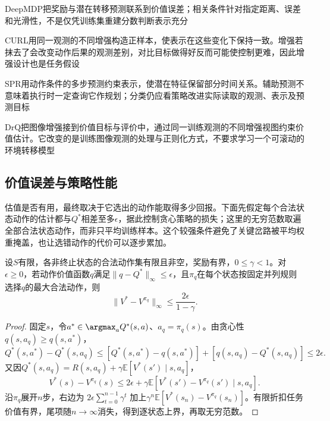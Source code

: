 DeepMDP把奖励与潜在转移预测联系到价值误差；相关条件针对指定距离、误差和光滑性，不是仅凭训练集重建分数判断表示充分

CURL用同一观测的不同增强构造正样本，使表示在这些变化下保持一致。增强若抹去了会改变动作后果的观测差别，对比目标做得好反而可能使控制更难，因此增强设计也是任务假设

SPR用动作条件的多步预测约束表示，使潜在特征保留部分时间关系。辅助预测不意味着执行时一定查询它作规划；分类仍应看策略改进实际读取的观测、表示及预测目标

DrQ把图像增强接到价值目标与评价中，通过同一训练观测的不同增强视图约束价值估计。它改变的是训练图像观测的处理与正则化方式，不要求学习一个可滚动的环境转移模型

\subsection{价值误差与策略性能}
\label{sec:rl-learning-value-performance}

估值是否有用，最终取决于它选出的动作能取得多少回报。下面先假定每个合法状态动作的估计都与$Q^*$相差至多$\epsilon$，据此控制贪心策略的损失；这里的无穷范数取遍全部合法状态动作，而非只平均训练样本。这个较强条件避免了关键岔路被平均权重掩盖，也让选错动作的代价可以逐步累加。

\begin{theorem}[动作价值误差到贪心策略损失]
  \label{thm:rl-learning-q-performance}
  设$S$有限，各非终止状态的合法动作集有限且非空，奖励有界，$0\leq\gamma<1$。对$\epsilon\geq0$，若动作价值函数$q$满足$\lVert q-Q^*\rVert_\infty\leq\epsilon$，且$\pi_q$在每个状态按固定并列规则选择$q$的最大合法动作，则
  \begin{equation}
    \lVert V^*-V^{\pi_q}\rVert_\infty
       \leq\frac{2\epsilon}{1-\gamma}.
    \label{eq:rl-learning-q-performance}
  \end{equation}
\end{theorem}
\begin{proof}
  固定$s$，令$a^*\in\argmax_aQ^*(s,a)$、$a_q=\pi_q(s)$。由贪心性$q(s,a_q)\geq q(s,a^*)$，
  \[
    Q^*(s,a^*)-Q^*(s,a_q)
      \leq[Q^*(s,a^*)-q(s,a^*)]
            +[q(s,a_q)-Q^*(s,a_q)]\leq2\epsilon.
  \]
  又因$Q^*(s,a_q)=R(s,a_q)+\gamma\mathbb E[V^*(s')\mid s,a_q]$，
  \[
    V^*(s)-V^{\pi_q}(s)
      \leq2\epsilon+\gamma
          \mathbb E[V^*(s')-V^{\pi_q}(s')\mid s,a_q].
  \]
  沿$\pi_q$展开$n$步，右边为
  $2\epsilon\sum_{t=0}^{n-1}\gamma^t$
  加上$\gamma^n\mathbb E[V^*(s_n)-V^{\pi_q}(s_n)]$。有限折扣任务价值有界，尾项随$n\to\infty$消失，得到逐状态上界，再取无穷范数。
\end{proof}

